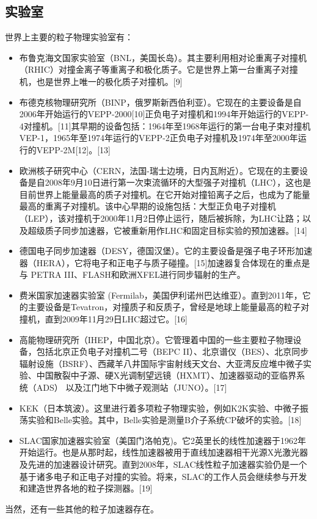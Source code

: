 \subsection{实验室}
世界上主要的粒子物理实验室有：
\begin{itemize}
\item 布鲁克海文国家实验室（BNL，美国长岛）。其主要利用相对论重离子对撞机（RHIC）对撞金离子等重离子和极化质子。它是世界上第一台重离子对撞机，也是世界上唯一的极化质子对撞机。[9]
\item 布德克核物理研究所（BINP，俄罗斯新西伯利亚）。它现在的主要设备是自2006年开始运行的VEPP-2000[10]正负电子对撞机和1994年开始运行的VEPP-4对撞机。[11]其早期的设备包括：1964年至1968年运行的第一台电子束对撞机VEP-1，1965年至1974年运行的VEPP-2正负电子对撞机及1974年至2000年运行的VEPP-2M[12]。[13]
\item 欧洲核子研究中心（CERN，法国-瑞士边境，日内瓦附近）。它现在的主要设备是自2008年9月10日进行第一次束流循环的大型强子对撞机（LHC），这也是目前世界上能量最高的质子对撞机。在它开始对撞铅离子之后，也成为了能量最高的重离子对撞机。该中心早期的设施包括：大型正负电子对撞机（LEP），该对撞机于2000年11月2日停止运行，随后被拆除，为LHC让路；以及超级质子同步加速器，它被重新用作LHC和固定目标实验的预加速器。[14]
\item 德国电子同步加速器（DESY，德国汉堡）。它的主要设备是强子电子环形加速器（HERA），它将电子和正电子与质子碰撞。[15]加速器复合体现在的重点是与 PETRA III、FLASH和欧洲XFEL进行同步辐射的生产。
\item 费米国家加速器实验室 (Fermilab，美国伊利诺州巴达维亚）。直到2011年，它的主要设备是Tevatron，对撞质子和反质子，曾经是地球上能量最高的粒子对撞机，直到2009年11月29日LHC超过它。[16]
\item 高能物理研究所（IHEP，中国北京）。它管理着中国的一些主要粒子物理设备，包括北京正负电子对撞机二号（BEPC II）、北京谱仪（BES）、北京同步辐射设施（BSRF）、西藏羊八井国际宇宙射线天文台、大亚湾反应堆中微子实验、中国散裂中子源、硬X光调制望远镜（HXMT）、加速器驱动的亚临界系统（ADS） 以及江门地下中微子观测站（JUNO）。[17]
\item KEK（日本筑波）。这里进行着多项粒子物理实验，例如K2K实验、中微子振荡实验和Belle实验。其中，Belle实验是测量B介子系统CP破坏的实验。[18]
\item SLAC国家加速器实验室（美国门洛帕克)。它2英里长的线性加速器于1962年开始运行。也是从那时起，线性加速器被用于直线加速器相干光源X光激光器及先进的加速器设计研究。直到2008年，SLAC线性粒子加速器实验仍是一个基于诸多电子和正电子对撞的实验。将来，SLAC的工作人员会继续参与开发和建造世界各地的粒子探测器。[19]
\end{itemize}
当然，还有一些其他的粒子加速器存在。

